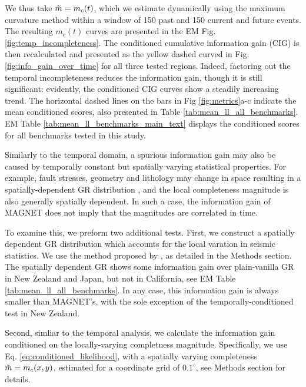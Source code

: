 \documentclass[pdflatex]{sn-jnl}
\begin{document}
We thus take $\Tilde{m}=m_c(t)$, which we estimate dynamically using the maximum curvature method \cite{wiemer_minimum_2000} within a window of 150 past and 150 current and future events. The resulting $m_c(t)$ curves are presented in the EM Fig. \ref{fig:temp_incompleteness}. The conditioned cumulative information gain (CIG) is then recalculated and presented as the yellow dashed curved in Fig.  \ref{fig:info_gain_over_time} for all three tested regions. 
Indeed, factoring out the temporal incompleteness reduces the information gain, though it is still significant: evidently, the conditioned CIG curves show a steadily increasing trend. The horizontal dashed lines on the bars in Fig \ref{fig:metrics}a-c indicate the mean conditioned scores, also presented in Table \ref{tab:mean_ll_all_benchmarks}. EM Table \ref{tab:mean_ll_benchmarks_main_text} displays the conditioned scores for all benchmarks tested in this study.

Similarly to the temporal domain, a spurious information gain may also be caused by temporally constant but spatially varying statistical properties. For example, fault stresses, geometry and lithology may change in space resulting in a spatially-dependent GR distribution \cite{amitrano_brittle-ductile_2003, scholz_stress_2015, herrmann_revealing_2022, taroni_earthquake_2023}, and the local completeness magnitude is also generally spatially dependent. In such a case, the information gain of MAGNET does not imply that the magnitudes are correlated in time. 

To examine this, we preform two additional tests.
First, we construct a spatially dependent GR distribution which accounts for the local varation in seismic statistics. We use the method proposed by \cite{taroni_highdefinition_2021}, as detailed in the Methods section. The spatially dependent GR shows some information gain over plain-vanilla GR in New Zealand and Japan, but not in California, see EM Table \ref{tab:mean_ll_all_benchmarks}. In any case, this information gain is always smaller than MAGNET's, with the sole exception of the temporally-conditioned test in New Zealand.

Second, simliar to the temporal analysis, we calculate the information gain conditioned on the locally-varying completness magnitude. Specifically, we use Eq. \ref{eq:conditioned_likelihood}, with a spatially varying completeness $\Tilde{m}=m_c(x,y)$, estimated for a coordinate grid of $0.1^\circ$, see Methods section for details.
\end{document}
